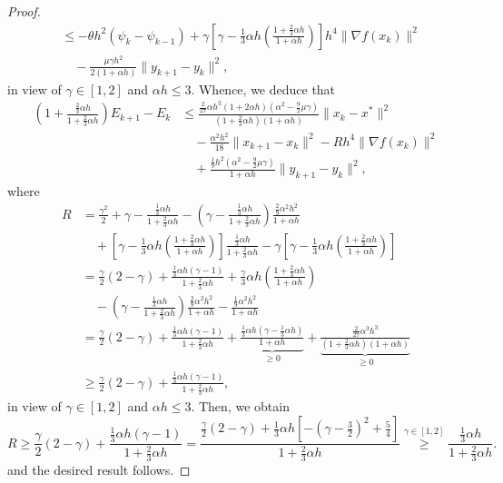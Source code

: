 \documentclass[pdflatex,sn-mathphys-num]{sn-jnl}
\theoremstyle{thmstyleone}
\theoremstyle{thmstyletwo}
\theoremstyle{thmstylethree}
\begin{document}
\begin{appendices}
\begin{proof}
\begin{align*}
&\le - \theta h^2 (\psi_k - \psi_{k-1})
     + \gamma \left[ \gamma  - \frac{1}{3}\alpha h\left( \frac{1 + \frac{2}{3}\alpha h}{1+\alpha h} \right) \right] h^4 \| \nabla f(x_k) \|^2 \\
&\quad - \frac{\mu\gamma h^2}{2(1+\alpha h)}\| y_{k+1} - y_k \|^2,    
\end{align*}
in view of $\gamma\in[1,2]$ and $\alpha h \le 3$. Whence, we deduce that
\begin{align*}
\left( 1 + \frac{\frac{2}{3}\alpha h}{1 + \frac{2}{3}\alpha h} \right) E_{k+1} - E_k
&\le \frac{\frac{2}{27}\alpha h^3 (1+2\alpha h) \left(\alpha^2 - \frac{9}{2}\mu\gamma \right)}{\left( 1+\frac{2}{3}\alpha h \right)(1+\alpha h)}\| x_k - x^* \|^2 \\
&\quad - \frac{\alpha^2 h^2}{18}\| x_{k+1}-x_k \|^2 
       - R h^4 \| \nabla f(x_k) \|^2 \\ 
&\quad  + \frac{\frac{1}{9} h^2 \left( \alpha^2 - \frac{9}{2}\mu\gamma \right)}{1 + \alpha h } \| y_{k+1} - y_k \|^2,  
\end{align*}
where
\begin{align*}
R
&= \frac{\gamma^2}{2} + \gamma - \frac{ \frac{1}{3}\alpha h }{ 1 + \frac{2}{3}\alpha h } 
  - \left( \gamma - \frac{\frac{1}{3}\alpha h}{1 + \frac{2}{3}\alpha h} \right)\frac{\frac{2}{9}\alpha^2 h^2}{1 + \alpha h } \\
&\quad + \left[ \gamma  - \frac{1}{3}\alpha h\left( \frac{1 + \frac{2}{3}\alpha h}{1+\alpha h} \right) \right] \frac{ \frac{1}{3}\alpha h }{1+\frac{2}{3}\alpha h} 
 - \gamma \left[ \gamma  - \frac{1}{3}\alpha h\left( \frac{1 + \frac{2}{3}\alpha h}{1+\alpha h} \right) \right] \\
&= \frac{\gamma}{2}(2-\gamma) + \frac{ \frac{1}{3}\alpha h (\gamma-1) }{ 1 + \frac{2}{3}\alpha h }
  + \frac{\gamma}{3}\alpha h\left( \frac{1 + \frac{2}{3}\alpha h}{1+\alpha h} \right) \\
&\quad - \left( \gamma - \frac{\frac{1}{3}\alpha h}{1 + \frac{2}{3}\alpha h} \right)\frac{\frac{2}{9}\alpha^2 h^2}{1 + \alpha h }
  - \frac{ \frac{1}{9}\alpha^2 h^2 }{1+\alpha h} \\
&= \frac{\gamma}{2}(2-\gamma) + \frac{ \frac{1}{3}\alpha h (\gamma-1) }{ 1 + \frac{2}{3}\alpha h }
  + \underbrace{ \frac{ \frac{1}{3}\alpha h \left( \gamma - \frac{1}{3}\alpha h \right) }{1+\alpha h} }_{\ge 0} 
  + \underbrace{ \frac{ \frac{2}{27}\alpha^3 h^3 }{\left( 1+\frac{2}{3}\alpha h \right)(1+\alpha h)} }_{\ge 0} \\
&\ge \frac{\gamma}{2}(2-\gamma) + \frac{ \frac{1}{3}\alpha h (\gamma-1) }{ 1 + \frac{2}{3}\alpha h },   
\end{align*}
in view of $\gamma\in[1,2]$ and $\alpha h \le 3$. Then, we obtain 
$$ R\ge \frac{\gamma}{2}(2-\gamma) + \frac{ \frac{1}{3}\alpha h (\gamma-1) }{ 1 + \frac{2}{3}\alpha h } = \frac{ \frac{\gamma}{2}(2-\gamma) + \frac{1}{3}\alpha h \left[ -\left( \gamma - \frac{3}{2} \right)^2 + \frac{5}{4} \right] }{ 1 + \frac{2}{3}\alpha h }
\stackrel{\gamma\in[1,2]}{\ge} \frac{ \frac{1}{3}\alpha h }{ 1 + \frac{2}{3}\alpha h }.  $$
and the desired result follows.
\end{proof}


\end{appendices}
\end{document}
